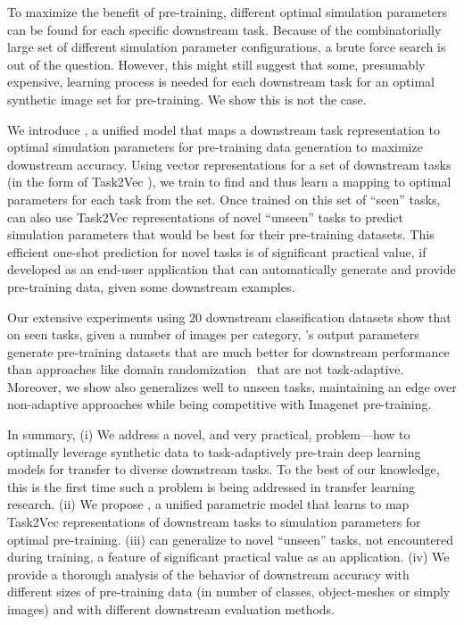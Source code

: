 

To maximize the benefit of pre-training, different optimal simulation parameters can be found for each specific downstream task. Because of the combinatorially large set of different simulation parameter configurations, a brute force search is out of the question. However, this might still suggest that some, presumably expensive, learning process is needed for each downstream task for an optimal synthetic image set for pre-training. We show this is not the case. 

We introduce \ours, a unified model that maps a downstream task representation to optimal simulation parameters for pre-training data generation to maximize downstream accuracy. Using vector representations for a set of downstream tasks (in the form of Task2Vec \cite{achille2019task2vec}), we train \ours to find and thus learn a mapping to optimal parameters for each task from the set. Once trained on this set of ``seen'' tasks, \ours can also use Task2Vec representations of novel ``unseen'' tasks to predict simulation parameters that would be best for their pre-training datasets. This efficient one-shot prediction for novel tasks is of significant practical value, if developed as an end-user application that can automatically generate and provide pre-training data, given some downstream examples.


Our extensive experiments using $20$ downstream classification datasets show that on seen tasks, given a number of images per category, \ours's output parameters generate pre-training datasets that are much better for downstream performance than approaches like domain randomization~\cite{yue2019domain,anderson2021sim,khirodkar2019domain} that are not task-adaptive. Moreover, we show \ours also generalizes well to unseen tasks, maintaining an edge over non-adaptive approaches while being competitive with Imagenet pre-training.

In summary,
(i) We address a novel, and very practical, problem---how to optimally leverage synthetic data to task-adaptively pre-train deep learning models for transfer to diverse downstream tasks.
To the best of our knowledge, this is the first time such a problem is being addressed in transfer learning research.  
(ii) We propose \ours, a unified parametric model that learns to map Task2Vec representations of downstream tasks to simulation parameters for optimal pre-training. 
(iii) \ours can generalize to novel ``unseen'' tasks, not encountered during training, a feature of significant practical value as an application. 
(iv) We provide a thorough analysis of the behavior of downstream accuracy with different sizes of pre-training data (in number of classes, object-meshes or simply images) and with different downstream evaluation methods. 


